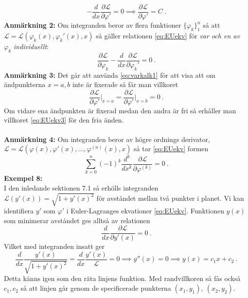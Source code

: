 \documentclass{article}
\begin{document}
$$
-\frac{d}{dx}\frac{\partial\mathcal{L}}{\partial\varphi'}=0\implies \frac{\partial\mathcal{L}}{\partial\varphi'}=C \ .
$$
\textbf{Anmärkning 2:} Om integranden beror av flera funktioner $\{\varphi_k\}_1^n$ så att $\mathcal{L}=\mathcal{L}(\varphi_k(x),\varphi_k'(x),x)$ så gäller relationen \eqref{eq:EUekv} för \textit{var och en av} $\varphi_k$ \textit{individuellt}:
\begin{equation}\label{eq:EUekv2}
    \frac{\partial \mathcal{L}}{\partial \varphi_k}-\frac{d}{dx}\frac{\partial\mathcal{L}}{\partial\varphi_k'}=0 \ .
\end{equation}
\textbf{Anmärkning 3:} Det går att använda \eqref{eq:varkalk1} för att visa att om ändpunkterna $x=a,b$ inte är fixerade så får man villkoret 
\begin{equation}\label{eq:EUekv3}
    \frac{\partial \mathcal{L}}{\partial\varphi'}\Big|_{x=a}=\frac{\partial \mathcal{L}}{\partial\varphi'}\Big|_{x=b}=0 \ .
\end{equation}
Om vidare ena ändpunkten är fixerad medan den andra är fri så erhåller man villkoret \eqref{eq:EUekv3} för den fria änden.\\ \\
\textbf{Anmärkning 4:} Om integranden beror av högre ordnings derivator, $\mathcal{L}=\mathcal{L}(\varphi(x),\varphi'(x),...,\varphi^{(n)}(x),x)$ så tar \eqref{eq:EUekv} formen
$$
\sum_{k=0}^n(-1)^k\frac{d^k}{dx^k}\frac{\partial\mathcal{L}}{\partial\varphi^{(k)}}=0 \ .
$$
\newpage
\noindent
\textbf{Exempel 8:}\\ I den inledande sektionen 7.1 så erhölls integranden $\mathcal{L}(y'(x))=\sqrt{1+y'(x)^2}$ för avståndet mellan två punkter i planet. Vi kan identifiera $y'$ som $\varphi'$ i Euler-Lagranges ekvationer \eqref{eq:EUekv}. Funktionen $y(x)$ som minimerar avståndet ges alltså av relationen
$$
\frac{d}{dx}\frac{\partial\mathcal{L}}{\partial y'(x)}=0 \ .
$$
Vilket med integranden insatt ger
$$
\frac{d}{dx}\frac{y'(x)}{\sqrt{1+y'(x)^2}}=\frac{d}{dx}\frac{y'(x)}{\mathcal{L}}=0\implies y''(x)=0\implies y(x)=c_1x+c_2 \ .
$$
Detta känns igen som den räta linjens funktion. Med randvillkoren så fås också $c_1,c_2$ så att linjen går genom de specificerade punkterna $(x_1,y_1), \ (x_2,y_2)$.
\end{document}

